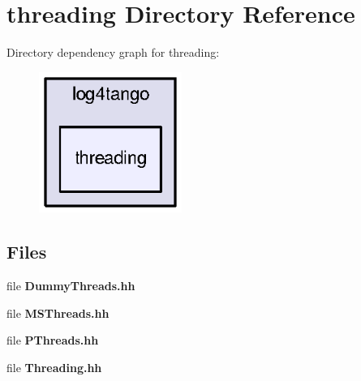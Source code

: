 \section{threading Directory Reference}
\label{dir_7ed89f74cc7707109e6c35de957955e2}
Directory dependency graph for threading\-:
\nopagebreak
\begin{figure}[H]
\begin{center}
\leavevmode
\includegraphics[width=132pt]{dir_7ed89f74cc7707109e6c35de957955e2_dep}
\end{center}
\end{figure}
\subsection*{Files}
\begin{DoxyCompactItemize}
\item 
file {\bf Dummy\-Threads.\-hh}
\item 
file {\bf M\-S\-Threads.\-hh}
\item 
file {\bf P\-Threads.\-hh}
\item 
file {\bf Threading.\-hh}
\end{DoxyCompactItemize}
